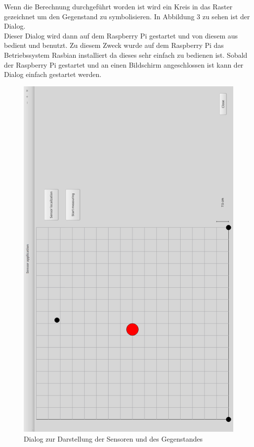 Wenn die Berechnung durchgeführt worden ist wird ein Kreis in das Raster gezeichnet um den Gegenstand zu symbolisieren. In Abbildung 3 zu sehen ist der Dialog.\\
Dieser Dialog wird dann auf dem Raspberry Pi gestartet und von diesem aus bedient und benutzt. Zu diesem Zweck wurde auf dem Raspberry Pi das Betriebssystem Rasbian installiert da dieses sehr einfach zu bedienen ist. Sobald der Raspberry Pi gestartet und an einen Bildschirm angeschlossen ist kann der Dialog einfach gestartet werden.
\begin{figure}
	\centering
	\includegraphics[width=(\textwidth)]{images/gui/03.png}
	\caption{Dialog zur Darstellung der Sensoren und des Gegenstandes} \label{img:gui3}
\end{figure}
